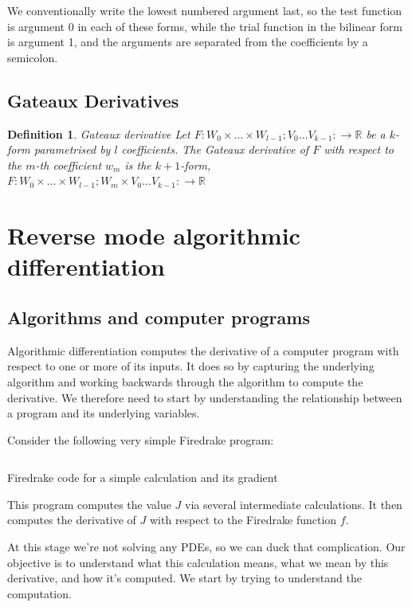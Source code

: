 \documentclass[a4paper,12pt]{report}
\newtheorem{definition}[chapter]{Definition}
\begin{document}
We conventionally write the lowest numbered argument last, so the test function
is argument 0 in each of these forms, while the trial function in the bilinear
form is argument 1, and the arguments are separated from the coefficients by a
semicolon.

\section{Gateaux Derivatives}

\begin{definition}{Gateaux derivative}
    Let $F: W_0\times \ldots \times W_{l-1}; V_0\ldots
    V_{k-1}:\rightarrow\mathbb{R}$ be a $k$-form parametrised by $l$
    coefficients. The \emph{Gateaux derivative} of $F$ with respect to the
    $m$-th coefficient $w_m$ is the $k+1$-form, $F: W_0\times \ldots \times
    W_{l-1}; W_m \times V_0\ldots V_{k-1}:\rightarrow\mathbb{R}$
\end{definition}

\chapter{Reverse mode algorithmic differentiation}


\section{Algorithms and computer programs}

Algorithmic differentiation computes the derivative of a computer program with
respect to one or more of its inputs. It does so by capturing the underlying
algorithm and working backwards through the algorithm to compute the
derivative. We therefore need to start by understanding the relationship
between a program and its underlying variables.

Consider the following very simple Firedrake program:
\begin{listing}
    \inputminted[linenos]{python3}{examples/assembly.py}
    \caption{Firedrake code for a simple calculation and its gradient}
    \label{lst:assembly_code}
\end{listing}

This program computes the value $J$ via several intermediate calculations. It
then computes the derivative of $J$ with respect to the Firedrake function $f$.

At this stage we're not solving any PDEs, so we can duck that complication. Our
objective is to understand what this calculation means, what we mean by this
derivative, and how it's computed. We start by trying to understand the
computation.
\end{document}
